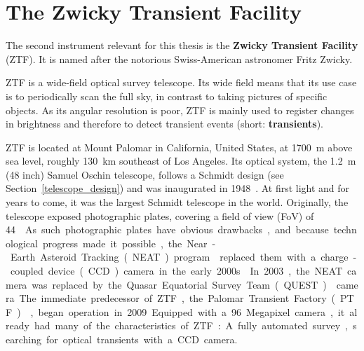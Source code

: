 \chapter{The Zwicky Transient Facility}\label{ztf}
The second instrument relevant for this thesis is the \textbf{Zwicky Transient Facility} (ZTF). It is named after the notorious Swiss-American astronomer Fritz Zwicky.

ZTF is a wide-field optical survey telescope. Its wide field means that its use case is to periodically scan the full sky, in contrast to taking pictures of specific objects. As its angular resolution is poor, ZTF is mainly used to register changes in brightness and therefore to detect transient events (short: \textbf{transients}).

ZTF is located at Mount Palomar in California, United States, at \SI{1700}{\m} above sea level, roughly \SI{130}{\km} southeast of Los Angeles. Its optical system, the \SI{1.2}{\m} (48 inch) Samuel Oschin telescope, follows a Schmidt design (see Section~\ref{telescope_design}) and was inaugurated in 1948~\cite{Harrington1952}. At first light and for years to come, it was the largest Schmidt telescope in the world. Originally, the telescope exposed photographic plates, covering a field of view (FoV) of \SI{44}{\square\deg}. As such photographic plates have obvious drawbacks, and because technological progress made it possible, the Near-Earth Asteroid Tracking (NEAT) program~ replaced them with a charge-coupled device (CCD) camera in the early 2000s.

In 2003, the NEAT camera was replaced by the Quasar Equatorial Survey Team (QUEST)~ camera. The immediate predecessor of ZTF, the Palomar Transient Factory (PTF)~, began operation in 2009. Equipped with a 96 Megapixel camera, it already had many of the characteristics of ZTF: A fully automated survey, searching for optical transients with a CCD camera.

